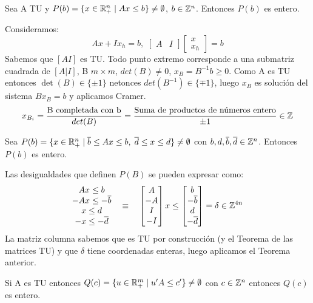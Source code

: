 \documentclass[PM.tex]{subfiles}
\begin{document}
\newpage
\begin{theorem}
Sea A TU y $P(b)=\{x \in \mathbb{R}^n_+ \mid Ax\leq b\} \neq \emptyset$, $b\in \mathbb{Z}^n$. Entonces $P(b)$ es entero.
\end{theorem}
\begin{dem}Consideramos:
\[
Ax +Ix_h = b, \; \begin{bmatrix} A & I \end{bmatrix} \begin{bmatrix}
x\\
x_h
\end{bmatrix} = b
\]
Sabemos que $[A I]$ es TU. Todo punto extremo corresponde a una submatriz cuadrada de $[A | I]$, B $m\times m$, $det(B)\neq 0$, $x_B=B^{-1}b\geq 0$. Como A es TU entonces $\det(B)\in\{\pm1\}$ netonces $det(B^{-1})\in\{\mp1\}$, luego $x_B$ es solución del sistema $Bx_B=b$ y aplicamos Cramer.
\[
x_{B_i}=\frac{\text{B completada con b}}{det(B)}=\frac{\text{Suma de productos de números entero}}{\pm1} \in \mathbb{Z}
\]\QED
\end{dem}
\begin{coro} Sea $P(b)=\{x \in \mathbb{R}^n_+ \mid \overline{b}\leq Ax\leq b,\; \overline{d}\leq x \leq d\} \neq \emptyset$ con $b,d,\overline{b},\overline{d}\in\mathbb{Z}^n$. Entonces $P(b)$ es entero.
\end{coro}
\begin{dem}
Las desigualdades que definen $P(B)$ se pueden expresar como:
\[
\begin{matrix}
Ax \leq b\\
-Ax\leq -\overline{b}\\
x\leq d\\
-x\leq -\overline{d}
\end{matrix}\quad
\equiv\quad
\begin{bmatrix}
A\\
-A\\
I\\
-I
\end{bmatrix}
x\leq
\begin{bmatrix}
b\\
-\overline{b}\\
d\\
-\overline{d}
\end{bmatrix} = \delta \in \mathbb{Z}^{4n}
\]
La matriz columna sabemos que es TU por construcción (y el Teorema de las matrices TU) y que $\delta$ tiene coordenadas enteras, luego aplicamos el Teorema anterior.\QED
\end{dem}
\begin{coro}
Si A es TU entonces $Q(c) = \{u\in\mathbb{R}^m_+ \mid u'A\leq c'\}\neq\emptyset$ con $c\in\mathbb{Z}^n$ entonces $Q(c)$ es entero.
\end{coro}
\end{document}
